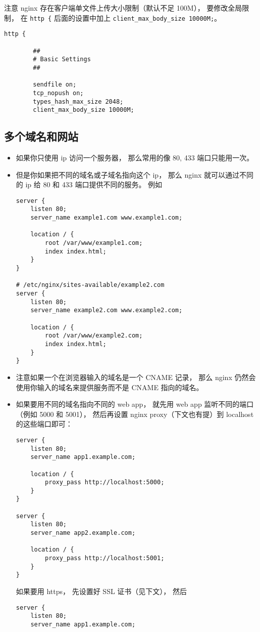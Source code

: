 注意 nginx 存在客户端单文件上传大小限制（默认不足 100M）， 要修改全局限制， 在 \verb`http {` 后面的设置中加上 \verb`client_max_body_size 10000M;`。
\begin{lstlisting}[language=none]
http {

        ##
        # Basic Settings
        ##

        sendfile on;
        tcp_nopush on;
        types_hash_max_size 2048;
        client_max_body_size 10000M;
\end{lstlisting}

\subsection{多个域名和网站}
\begin{itemize}
\item 如果你只使用 ip 访问一个服务器， 那么常用的像 80, 433 端口只能用一次。
\item 但是你如果把不同的域名或子域名指向这个 ip， 那么 nginx 就可以通过不同的 ip 给 80 和 433 端口提供不同的服务。 例如
\begin{lstlisting}[language=none]
server {
    listen 80;
    server_name example1.com www.example1.com;

    location / {
        root /var/www/example1.com;
        index index.html;
    }
}

# /etc/nginx/sites-available/example2.com
server {
    listen 80;
    server_name example2.com www.example2.com;

    location / {
        root /var/www/example2.com;
        index index.html;
    }
}
\end{lstlisting}
\item 注意如果一个在浏览器输入的域名是一个 CNAME 记录， 那么 nginx 仍然会使用你输入的域名来提供服务而不是 CNAME 指向的域名。
\item 如果要用不同的域名指向不同的 web app， 就先用 web app 监听不同的端口（例如 5000 和 5001）， 然后再设置 nginx proxy（下文也有提）到 localhost 的这些端口即可：
\begin{lstlisting}[language=none]
server {
    listen 80;
    server_name app1.example.com;

    location / {
        proxy_pass http://localhost:5000;
    }
}

server {
    listen 80;
    server_name app2.example.com;

    location / {
        proxy_pass http://localhost:5001;
    }
}
\end{lstlisting}
如果要用 https， 先设置好 SSL 证书（见下文）， 然后
\begin{lstlisting}[language=none]
server {
    listen 80;
    server_name app1.example.com;


\end{lstlisting}
\end{itemize}
